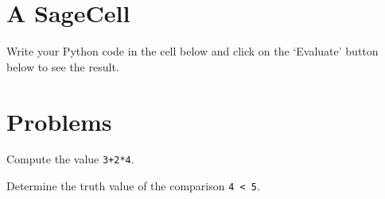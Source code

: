 \documentclass{ximera}
\begin{document}
\section{A SageCell}

Write your Python code in the cell below and click on the `Evaluate' button below to see the result.

\begin{sageCell}

\end{sageCell}

\section{Problems}

\begin{problem}
	Compute the value \verb|3+2*4|. 
\end{problem}

\begin{problem}
	Determine the truth value of the comparison \verb|4 < 5|. 
\end{problem}
\end{document}
